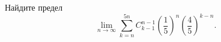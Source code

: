 \documentclass{article}
\begin{document}
Найдите предел
$$\lim_{n \to \infty} \sum_{k=n}^{5n} C_{k-1}^{n-1} \left( \frac15 \right)^n \left( \frac45 \right)^{k-n}.$$
\end{document}
